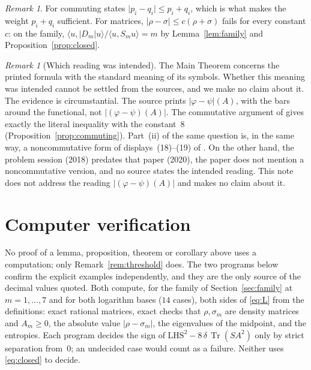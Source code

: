 \documentclass[11pt]{amsart}
\theoremstyle{definition}\newtheorem{definition}[theorem]{Definition}
\theoremstyle{remark}\newtheorem{remark}[theorem]{Remark}
\DeclareMathOperator{\Tr}{Tr}
\newcommand{\abs}[1]{\lvert #1\rvert}
\newcommand{\LHS}{\mathrm{LHS}}
\begin{document}
\begin{remark}\label{rem:breaks}
For commuting states \(\abs{p_i-q_i}\le p_i+q_i\), which is what makes the weight \(p_i+q_i\) sufficient. For matrices, \(\abs{\rho-\sigma}\le c(\rho+\sigma)\) fails for every constant \(c\): on the family, \(\langle u,\abs{D_m}u\rangle/\langle u,S_mu\rangle=m\) by Lemma~\ref{lem:family} and Proposition~\ref{prop:closed}.
\end{remark}

\begin{remark}[Which reading was intended]\label{rem:reading}
The Main Theorem concerns the printed formula with the standard meaning of its symbols. Whether this meaning was intended cannot be settled from the sources, and we make no claim about it. The evidence is circumstantial. The source prints \(\abs{\varphi-\psi}(A)\), with the bars around the functional, not \(\abs{(\varphi-\psi)(A)}\). The commutative argument of \cite{ozawa20} gives exactly the literal inequality with the constant~\(8\) (Proposition~\ref{prop:commuting}). Part~(ii) of the same question is, in the same way, a noncommutative form of displays~(18)--(19) of \cite{ozawa20}. On the other hand, the problem session (2018) predates that paper (2020), the paper does not mention a noncommutative version, and no source states the intended reading. This note does not address the reading \(\abs{(\varphi-\psi)(A)}\) and makes no claim about it.
\end{remark}

\section{Computer verification}\label{sec:computer}

No proof of a lemma, proposition, theorem or corollary above uses a computation; only Remark~\ref{rem:threshold} does. The two programs below confirm the explicit examples independently, and they are the only source of the decimal values quoted. Both compute, for the family of Section~\ref{sec:family} at \(m=1,\dots,7\) and for both logarithm bases (\(14\) cases), both sides of \eqref{eq:L} from the definitions: exact rational matrices, exact checks that \(\rho,\sigma_m\) are density matrices and \(A_m\ge0\), the absolute value \(\abs{\rho-\sigma_m}\), the eigenvalues of the midpoint, and the entropies. Each program decides the sign of \(\LHS^2-8\,\delta\,\Tr(SA^2)\) only by strict separation from~\(0\); an undecided case would count as a failure. Neither uses \eqref{eq:closed} to decide.
\end{document}
